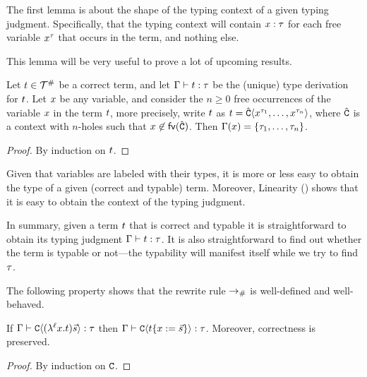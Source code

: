 
The first lemma is about the shape of the typing context of a given typing judgment.
Specifically, that the typing context will contain $x : \tau$ for each free variable
$x^\tau$ that occurs in the term, and nothing else.

This lemma will be very useful to prove a lot of upcoming results.

\begin{lemma}[Linearity]
Let $t \in \mathcal{T}^{\mathtt{\#}}$ be a correct term,
and let $\Gamma \vdash t : \tau$ be the (unique) type derivation for $t$.
Let $x$ be any variable,
and consider the $n \geq 0$ free occurrences of the variable $x$ in the term $t$,
more precisely, write $t$ as $t = \hat{\mathtt{C}}\langle x^{\tau_1},\hdots,x^{\tau_n}\rangle$,
where $\hat{\mathtt{C}}$ is a context with $n$-holes such that $x \not\in \mathsf{fv}({\hat{\mathtt{C}}})$.
Then $\Gamma(x) = \{\tau_1,\hdots,\tau_n\}$.
\end{lemma}
\begin{proof}
By induction on $t$.
\end{proof}


\begin{remark}
  Given that variables are labeled with their types, it is more or less easy to obtain
  the type of a given (correct and typable) term.
  Moreover, Linearity () shows that it is easy to obtain the context of the typing judgment.

  In summary, given a term $t$ that is correct and typable
  it is straightforward to obtain its typing judgment
  $\Gamma \vdash t : \tau$.
  It is also straightforward to find out whether the term is typable or not---the
  typability will manifest itself while we try to find $\tau$.
\end{remark}



The following property shows that the rewrite rule $\mathrel{\to_{\mathtt{\#}}}$ is well-defined and well-behaved.



\begin{lemma}
If $\Gamma \vdash \mathtt{C}\langle(\lambda^{\ell} x. t) \vec{s}\rangle : \tau$
then $\Gamma \vdash \mathtt{C}\langle t\{x := \vec{s}\}\rangle : \tau$.
Moreover, correctness is preserved.
\end{lemma}
\begin{proof}
 By induction on $\mathtt{C}$.
\end{proof}

